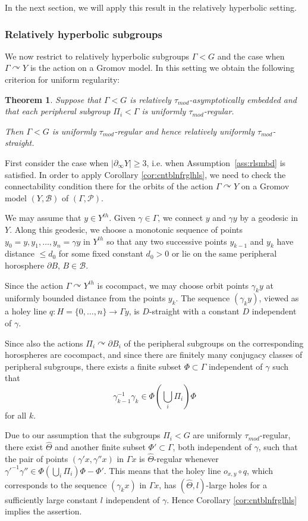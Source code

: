 \documentclass[12pt]{article}
\theoremstyle{boldplain}
\newtheorem{thm}[equation]{Theorem}
\theoremstyle{bolddefinition}
\numberwithin{equation}{section}
\def\P{\mathcal P}
\def\ga{\gamma}
\def\Ga{\Gamma}
\def\acts{\curvearrowright}
\def\D{\partial}
\def\geo{\partial_{\infty}}
\def\taumod{\tau_{mod}}
\begin{document}
\medskip
In the next section, we will apply this result in the relatively hyperbolic setting.


\subsubsection{Relatively hyperbolic subgroups}\label{sec:ae->unstr} 

We now restrict to relatively hyperbolic subgroups $\Ga<G$ 
and the case when $\Ga\acts Y$ is the action on a Gromov model. 
In this setting we obtain the following criterion for uniform regularity:

\begin{thm}
\label{thm:ae->str}
Suppose that $\Ga< G$ is relatively $\taumod$-asymptotically embedded 
and that each peripheral subgroup $\Pi_i< \Ga$ is uniformly $\taumod$-regular. 

Then $\Ga< G$ is uniformly $\taumod$-regular and hence relatively uniformly $\taumod$-straight.
\end{thm}
\proof First consider the case when $|\geo Y|\geq3$,
i.e. when Assumption~\ref{ass:rlsmbd} is satisfied.
In order to apply Corollary \ref{cor:cntblnfrglhls}, 
we need to check the connectability condition there 
for the orbits of the action $\Ga\acts Y$ on a Gromov model $(Y,{\mathcal B})$ of $(\Ga,\P)$.


We may assume that $y\in Y^{th}$.
Given $\ga\in\Ga$,
we connect $y$ and $\ga y$ by a geodesic in $Y$.
Along this geodesic, we choose a monotonic sequence of points $y_0=y,y_1,\ldots,y_n=\ga y$ in $Y^{th}$ 
so that any two successive points $y_{k-1}$ and $y_k$ have distance $\leq d_0$ for some fixed constant $d_0>0$
or lie on the same peripheral horosphere $\D B$, $B\in{\mathcal B}$.

Since the action $\Ga\acts Y^{th}$ is cocompact,
we may choose orbit points $\ga_k y$ 
at uniformly bounded distance from the points $y_k$. 
The sequence $(\ga_k y)$, viewed as a holey line $q:H=\{0,\ldots,n\}\to\Ga y$,
is $D$-straight with a constant $D$ independent of $\ga$.

Since also the actions $\Pi_i\acts\D B_i$ of the peripheral subgroups on the corresponding horospheres are cocompact,
and since there are finitely many conjugacy classes of peripheral subgroups,
there exists a finite subset $\Phi\subset\Ga$ independent of $\ga$ such that 
$$\ga_{k-1}^{-1}\ga_k\in \Phi(\bigcup_i\Pi_i)\Phi$$ for all $k$.

Due to our assumption that the subgroups $\Pi_i< G$ are uniformly $\taumod$-regular,
there exist $\hat\Theta$ and another finite subset $\Phi'\subset\Ga$, both independent of $\ga$, 
such that the pair of points $(\ga' x,\ga'' x)$ in $\Ga x$ is $\hat\Theta$-regular 
whenever ${\ga'}^{-1}\ga''\in \Phi(\bigcup_i\Pi_i)\Phi - \Phi'$.
This means that the holey line $o_{x,y}\circ q$, which corresponds to the sequence $(\ga_k x)$ in $\Ga x$,
has $(\hat\Theta,l)$-large holes 
for a sufficiently large constant $l$ independent of $\ga$.
Hence Corollary \ref{cor:cntblnfrglhls} implies the assertion.
\end{document}
